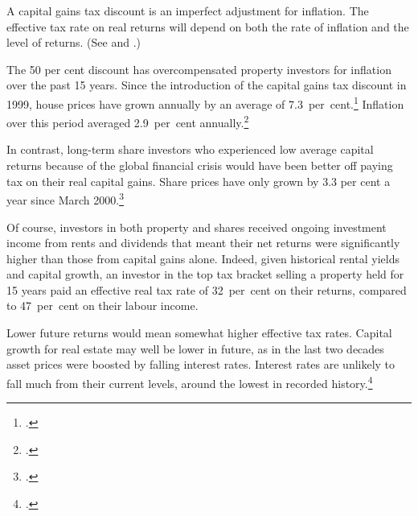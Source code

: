 \documentclass{grattanAlpha}\usepackage[]{graphicx}\usepackage[]{color}
\begin{document}
A capital gains tax discount is an imperfect adjustment for inflation. The effective tax rate on real returns will depend on both the rate of inflation and the level of returns. (See  and .)

The 50 per cent discount has overcompensated property investors for inflation over the past 15 years. Since the introduction of the capital gains tax discount in 1999, house prices have grown annually by an average of 7.3~per~cent.\footcite{ABS2015HousingFinance} Inflation over this period averaged 2.9~per~cent annually.\footcite{ABSVariousyearsCPI}

In contrast, long-term share investors who experienced low average capital returns because of the global financial crisis would have been better off paying tax on their real capital gains. Share prices have only grown by 3.3 per cent a year since March 2000.\footcite{Finance2015}

Of course, investors in both property and shares received ongoing investment income from rents and dividends that meant their net returns were significantly higher than those from capital gains alone. Indeed, given historical rental yields and capital growth, an investor in the top tax bracket selling a property held for 15 years paid an effective real tax rate of 32~per~cent on their returns, compared to 47~per~cent on their labour income.

Lower future returns would mean somewhat higher effective tax rates. Capital growth for real estate may well be lower in future, as in the last two decades asset prices were boosted by falling interest rates. Interest rates are unlikely to fall much from their current levels, around the lowest in recorded history.\footcite[][19]{Haldane2015}
\end{document}
